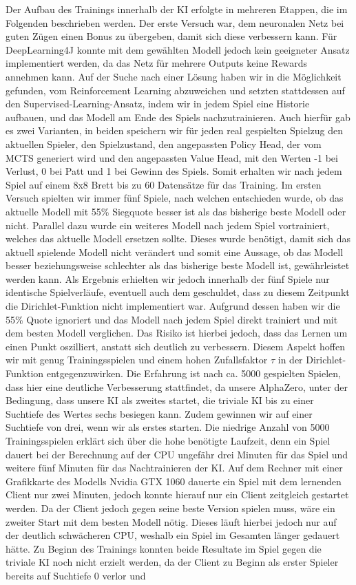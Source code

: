 \documentclass[12pt,a4paper]{article}
\begin{document}
Der Aufbau des Trainings innerhalb der KI erfolgte in mehreren Etappen, die im Folgenden beschrieben werden. Der erste Versuch war, dem neuronalen Netz bei guten Zügen einen Bonus zu übergeben, damit sich diese verbessern kann. Für DeepLearning4J konnte mit dem gewählten Modell jedoch kein geeigneter Ansatz implementiert werden, da das Netz für mehrere Outputs keine Rewards annehmen kann. Auf der Suche nach einer Lösung haben wir in \cite{Silver2017} die Möglichkeit gefunden, vom Reinforcement Learning abzuweichen und setzten stattdessen auf den Supervised-Learning-Ansatz, indem wir in jedem Spiel eine Historie aufbauen, und das Modell am Ende des Spiels nachzutrainieren. Auch hierfür gab es zwei Varianten, in beiden speichern wir für jeden real gespielten Spielzug den aktuellen Spieler, den Spielzustand, den angepassten Policy Head, der vom MCTS generiert wird und den angepassten Value Head, mit den Werten -1 bei Verlust, 0 bei Patt und 1 bei Gewinn des Spiels. Somit erhalten wir nach jedem Spiel auf einem 8x8 Brett bis zu 60 Datensätze für das Training. Im ersten Versuch spielten wir immer fünf Spiele, nach welchen entschieden wurde, ob das aktuelle Modell mit 55\% Siegquote besser ist als das bisherige beste Modell oder nicht. Parallel dazu wurde ein weiteres Modell nach jedem Spiel vortrainiert, welches das aktuelle Modell ersetzen sollte. Dieses wurde benötigt, damit sich das aktuell spielende Modell nicht verändert und somit eine Aussage, ob das Modell besser beziehungsweise schlechter als das bisherige beste Modell ist, gewährleistet werden kann. Als Ergebnis erhielten wir jedoch innerhalb der fünf Spiele nur identische Spielverläufe, eventuell auch dem geschuldet, dass zu diesem Zeitpunkt die Dirichlet-Funktion nicht implementiert war. Aufgrund dessen haben wir die 55\% Quote ignoriert und das Modell nach jedem Spiel direkt trainiert und mit dem besten Modell verglichen. Das Risiko ist hierbei jedoch, dass das Lernen um einen Punkt oszilliert, anstatt sich deutlich zu verbessern. Diesem Aspekt hoffen wir mit genug Trainingsspielen und einem hohen Zufallsfaktor $\tau$ in der Dirichlet-Funktion entgegenzuwirken. Die Erfahrung ist nach ca. 5000 gespielten Spielen, dass hier eine deutliche Verbesserung stattfindet, da unsere AlphaZero, unter der Bedingung, dass unsere KI als zweites startet, die triviale KI bis zu einer Suchtiefe des Wertes sechs besiegen kann. Zudem gewinnen wir auf einer Suchtiefe von drei, wenn wir als erstes starten. Die niedrige Anzahl von 5000 Trainingsspielen erklärt sich über die hohe benötigte Laufzeit, denn ein Spiel dauert bei der Berechnung auf der CPU ungefähr drei Minuten für das Spiel und weitere fünf Minuten für das Nachtrainieren der KI. Auf dem Rechner mit einer Grafikkarte des Modells Nvidia GTX 1060 dauerte ein Spiel mit dem lernenden Client nur zwei Minuten, jedoch konnte hierauf nur ein Client zeitgleich gestartet werden. Da der Client jedoch gegen seine beste Version spielen muss, wäre ein zweiter Start mit dem besten Modell nötig. Dieses läuft hierbei jedoch nur auf der deutlich schwächeren CPU, weshalb ein Spiel im Gesamten länger gedauert hätte. Zu Beginn des Trainings konnten beide Resultate im Spiel gegen die triviale KI noch nicht erzielt werden, da der Client zu Beginn als erster Spieler bereits auf Suchtiefe 0 verlor und 
\end{document}
